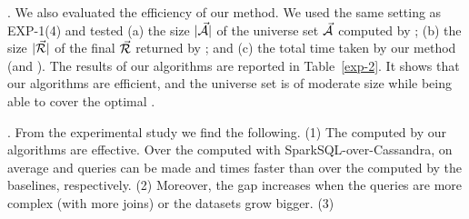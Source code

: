 .
We also evaluated the efficiency of our method.
We used the same setting as EXP-1(4) and tested
(a) the size $|\vec{{\mathcal A}}|$ of the universe set $\vec{{\mathcal A}}$ computed by \usc;
(b) the size $|\vec{{\mathcal R}}|$ of the final \bds $\vec{{\mathcal R}}$ returned by \opts; and
(c) the total time taken by our method (\ie \opts and \usc).
The results of our algorithms
are reported in Table~\ref{exp-2}. It shows that our algorithms are
efficient, and the universe set is of moderate size while being
able to cover the optimal \bdss. 


. From the experimental study we find the following.
  (1)  The \bdss computed by our algorithms are effective.
  Over the computed  \bdss with SparkSQL-over-Cassandra,
  on average \tpch and \tpcds queries can be made  and 
 times faster than over the \bdss computed by the baselines,
 respectively.
 (2) Moreover, the gap increases when the queries are more
 complex (\ie with more joins) or the datasets grow bigger.
 (3) 



